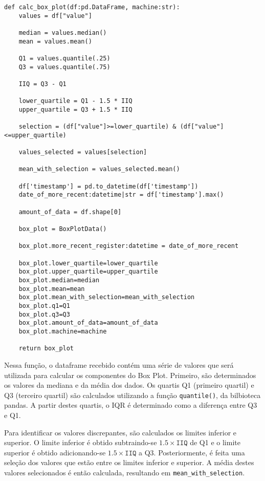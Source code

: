 \begin{verbatim}
def calc_box_plot(df:pd.DataFrame, machine:str):
    values = df["value"]

    median = values.median()
    mean = values.mean()

    Q1 = values.quantile(.25)
    Q3 = values.quantile(.75)

    IIQ = Q3 - Q1

    lower_quartile = Q1 - 1.5 * IIQ
    upper_quartile = Q3 + 1.5 * IIQ
    
    selection = (df["value"]>=lower_quartile) & (df["value"]<=upper_quartile)

    values_selected = values[selection]
    
    mean_with_selection = values_selected.mean()

    df['timestamp'] = pd.to_datetime(df['timestamp'])
    date_of_more_recent:datetime|str = df['timestamp'].max()

    amount_of_data = df.shape[0]

    box_plot = BoxPlotData()

    box_plot.more_recent_register:datetime = date_of_more_recent

    box_plot.lower_quartile=lower_quartile
    box_plot.upper_quartile=upper_quartile
    box_plot.median=median
    box_plot.mean=mean
    box_plot.mean_with_selection=mean_with_selection
    box_plot.q1=Q1
    box_plot.q3=Q3
    box_plot.amount_of_data=amount_of_data
    box_plot.machine=machine

    return box_plot
\end{verbatim}

Nessa função, o dataframe recebido contém uma série de valores que será utilizada para calcular os componentes do Box Plot. Primeiro, são determinados os valores da mediana e da média dos dados. Os quartis Q1 (primeiro quartil) e Q3 (terceiro quartil) são calculados utilizando a função \texttt{quantile()}, da bilbioteca pandas. A partir destes quartis, o \gls{IQR} é determinado como a diferença entre Q3 e Q1.

Para identificar os valores discrepantes, são calculados os limites inferior e superior. O limite inferior é obtido subtraindo-se \(1.5 \times \texttt{IIQ}\) de Q1 e o limite superior é obtido adicionando-se \(1.5 \times \texttt{IIQ}\) a Q3. Posteriormente, é feita uma seleção dos valores que estão entre os limites inferior e superior. A média destes valores selecionados é então calculada, resultando em \texttt{mean\_with\_selection}.

